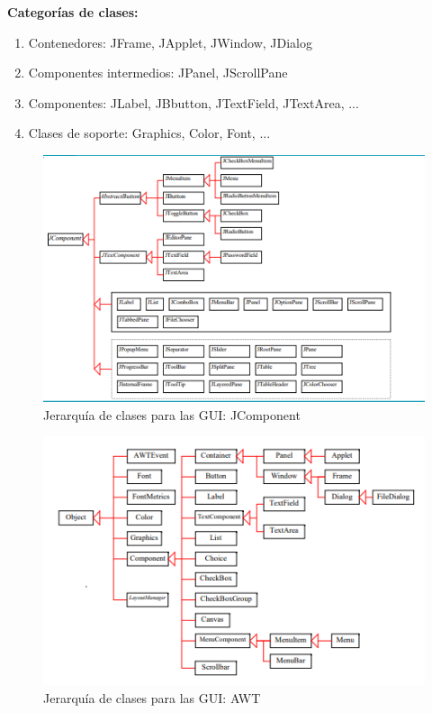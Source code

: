 \documentclass[12pt,a4paper]{report}
\begin{document}
{\textbf{Categorías de clases: }
\begin{enumerate}
\item Contenedores: JFrame, JApplet, JWindow, JDialog 
\item Componentes intermedios: JPanel, JScrollPane 
\item Componentes: JLabel, JBbutton, JTextField, JTextArea, ... 
\item Clases de soporte: Graphics, Color, Font, ...
\end{enumerate}

\begin{figure}[hbtp]
\caption{Jerarquía de clases para las GUI: JComponent}
\centering
\includegraphics[scale=0.8]{JComponent.PNG}
\end{figure}

\begin{figure}[hbtp]
\caption{Jerarquía de clases para las GUI: AWT}
\centering
\includegraphics[scale=0.8]{Jerarquia AWT.PNG}
\end{figure}

}
\end{document}
